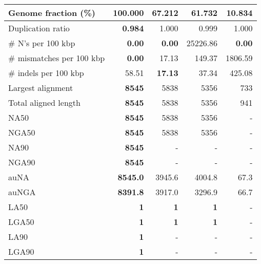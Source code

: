 \documentclass[12pt,a4paper]{article}
\begin{document}
\begin{table}[ht]
\begin{center}
\begin{tabular}{|l*{4}{|r}|}
Genome fraction (\%) & {\bf 100.000} & 67.212 & 61.732 & 10.834 \\ \hline
Duplication ratio & {\bf 0.984} & 1.000 & 0.999 & 1.000 \\ \hline
\# N's per 100 kbp & {\bf 0.00} & {\bf 0.00} & 25226.86 & {\bf 0.00} \\ \hline
\# mismatches per 100 kbp & {\bf 0.00} & 17.13 & 149.37 & 1806.59 \\ \hline
\# indels per 100 kbp & 58.51 & {\bf 17.13} & 37.34 & 425.08 \\ \hline
Largest alignment & {\bf 8545} & 5838 & 5356 & 733 \\ \hline
Total aligned length & {\bf 8545} & 5838 & 5356 & 941 \\ \hline
NA50 & {\bf 8545} & 5838 & 5356 & - \\ \hline
NGA50 & {\bf 8545} & 5838 & 5356 & - \\ \hline
NA90 & {\bf 8545} & - & - & - \\ \hline
NGA90 & {\bf 8545} & - & - & - \\ \hline
auNA & {\bf 8545.0} & 3945.6 & 4004.8 & 67.3 \\ \hline
auNGA & {\bf 8391.8} & 3917.0 & 3296.9 & 66.7 \\ \hline
LA50 & {\bf 1} & {\bf 1} & {\bf 1} & - \\ \hline
LGA50 & {\bf 1} & {\bf 1} & {\bf 1} & - \\ \hline
LA90 & {\bf 1} & - & - & - \\ \hline
LGA90 & {\bf 1} & - & - & - \\ \hline
\end{tabular}
\end{center}
\end{table}
\end{document}
